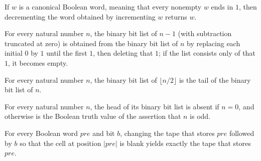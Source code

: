 \begin{lemma}
\label{Complexity.LogProg.decW_incW}
\leanok
{}
If $w$ is a canonical Boolean word, meaning that every nonempty $w$ ends in $1$, then
decrementing the word obtained by incrementing $w$ returns $w$.
\end{lemma}

\begin{lemma}
\label{Complexity.LogProg.bits_pred}
\leanok
{}
For every natural number $n$, the binary bit list of $n-1$ (with subtraction truncated
at zero) is obtained from the binary bit list of $n$ by replacing each initial $0$ by
$1$ until the first $1$, then deleting that $1$; if the list consists only of that $1$,
it becomes empty.
\end{lemma}

\begin{lemma}
\label{Complexity.LogProg.bits_half}
\leanok
{}
For every natural number $n$, the binary bit list of $\lfloor n/2\rfloor$ is the tail
of the binary bit list of $n$.
\end{lemma}

\begin{lemma}
\label{Complexity.LogProg.bits_head_odd}
\leanok
{}
For every natural number $n$, the head of its binary bit list is absent if $n=0$, and
otherwise is the Boolean truth value of the assertion that $n$ is odd.
\end{lemma}

\begin{lemma}
\label{Complexity.LogProg.bufferTape_erase_last}
\leanok
{}
For every Boolean word $\mathit{pre}$ and bit $b$, changing the tape that stores
$\mathit{pre}$ followed by $b$ so that the cell at position $|\mathit{pre}|$ is blank
yields exactly the tape that stores $\mathit{pre}$.
\end{lemma}

